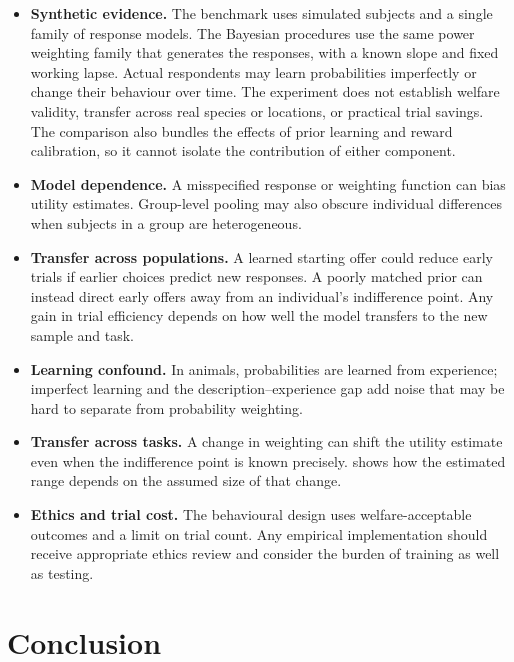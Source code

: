 \documentclass[11pt,a4paper]{article}
\begin{document}
\begin{itemize}[leftmargin=*]
  \item \textbf{Synthetic evidence.} The benchmark uses simulated subjects and a single family of response models. The Bayesian procedures use the same power weighting family that generates the responses, with a known slope and fixed working lapse. Actual respondents may learn probabilities imperfectly or change their behaviour over time. The experiment does not establish welfare validity, transfer across real species or locations, or practical trial savings. The comparison also bundles the effects of prior learning and reward calibration, so it cannot isolate the contribution of either component.
  \item \textbf{Model dependence.} A misspecified response or weighting function can bias utility estimates. Group-level pooling may also obscure individual differences when subjects in a group are heterogeneous.
  \item \textbf{Transfer across populations.} A learned starting offer could reduce early trials if earlier choices predict new responses. A poorly matched prior can instead direct early offers away from an individual's indifference point. Any gain in trial efficiency depends on how well the model transfers to the new sample and task.
  \item \textbf{Learning confound.} In animals, probabilities are learned from experience; imperfect learning and the description--experience gap \citep{hertwig2004} add noise that may be hard to separate from probability weighting.
  \item \textbf{Transfer across tasks.} A change in weighting can shift the utility estimate even when the indifference point is known precisely.  shows how the estimated range depends on the assumed size of that change.
  \item \textbf{Ethics and trial cost.} The behavioural design uses welfare-acceptable outcomes and a limit on trial count. Any empirical implementation should receive appropriate ethics review and consider the burden of training as well as testing.
\end{itemize}

\section{Conclusion}
\label{sec:conclusion}
\end{document}
